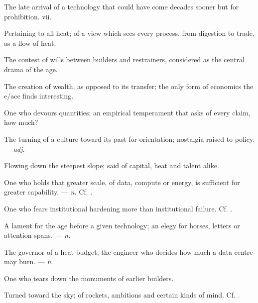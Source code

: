  The late arrival of a technology that could have come decades sooner but for prohibition.   vii.

 Pertaining to all heat; of a view which sees every process, from digestion to trade, as a flow of heat.

 The contest of wills between builders and restrainers, considered as the central drama of the age.

 The creation of wealth, as opposed to its transfer; the only form of economics the e/acc finds interesting.

 One who devours quantities; an empirical temperament that asks of every claim, how much?

 The turning of a culture toward its past for orientation; nostalgia raised to policy. ---  \textit{adj.}

 Flowing down the steepest slope; said of capital, heat and talent alike.

 One who holds that greater scale, of data, compute or energy, is sufficient for greater capability. ---  \textit{n.} Cf. .

 One who fears institutional hardening more than institutional failure. Cf. .

 A lament for the age before a given technology; an elegy for horses, letters or attention spans. ---  \textit{n.}

 The governor of a heat-budget; the engineer who decides how much a data-centre may burn. ---  \textit{n.}

 One who tears down the monuments of earlier builders.

 Turned toward the sky; of rockets, ambitions and certain kinds of mind. Cf. .

